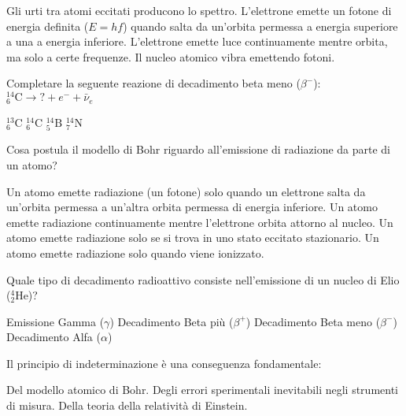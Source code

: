 \documentclass{exam}%
\begin{document}
\begin{questions}
\vspace{0.2em}%
\begin{choices}%
\choice Gli urti tra atomi eccitati producono lo spettro.%
\choice L'elettrone emette un fotone di energia definita ($E = hf$) quando salta da un'orbita permessa a energia superiore a una a energia inferiore.%
\choice L'elettrone emette luce continuamente mentre orbita, ma solo a certe frequenze.%
\choice Il nucleo atomico vibra emettendo fotoni.%
\end{choices}%
\question Completare la seguente reazione di decadimento beta meno ($\beta^-$): $^{14}_{6}\text{C} \rightarrow ? + e^- + \bar{\nu}_e$%
\vspace{0.2em}%
\begin{multicols}{4}%
\begin{choices}%
\choice $^{13}_{6}\text{C}$%
\choice $^{14}_{6}\text{C}$%
\choice $^{14}_{5}\text{B}$%
\choice $^{14}_{7}\text{N}$%
\end{choices}%
\end{multicols}%
\question Cosa postula il modello di Bohr riguardo all'emissione di radiazione da parte di un atomo?%
\vspace{0.2em}%
\begin{choices}%
\choice Un atomo emette radiazione (un fotone) solo quando un elettrone salta da un'orbita permessa a un'altra orbita permessa di energia inferiore.%
\choice Un atomo emette radiazione continuamente mentre l'elettrone orbita attorno al nucleo.%
\choice Un atomo emette radiazione solo se si trova in uno stato eccitato stazionario.%
\choice Un atomo emette radiazione solo quando viene ionizzato.%
\end{choices}%
\question Quale tipo di decadimento radioattivo consiste nell'emissione di un nucleo di Elio ($^4_2\text{He}$)?%
\vspace{0.2em}%
\begin{multicols}{2}%
\begin{choices}%
\choice Emissione Gamma ($\gamma$)%
\choice Decadimento Beta più ($\beta^+$)%
\choice Decadimento Beta meno ($\beta^-$)%
\choice Decadimento Alfa ($\alpha$)%
\end{choices}%
\end{multicols}%
\question Il principio di indeterminazione è una conseguenza fondamentale:%
\vspace{0.2em}%
\begin{choices}%
\choice Del modello atomico di Bohr.%
\choice Degli errori sperimentali inevitabili negli strumenti di misura.%
\choice Della teoria della relatività di Einstein.%

\end{choices}
\end{questions}
\end{document}
